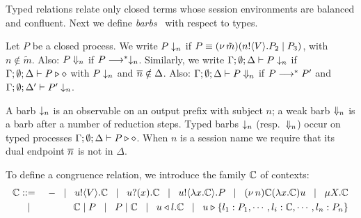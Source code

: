 \documentclass[a4paper,UKenglish]{lipics}
\theoremstyle{definition}
\begin{document}
\noi Typed relations relate only closed terms whose
session environments %
are balanced  and confluent.
Next we define  {\em barbs}~\cite{MiSa92}
with respect to types. 


\begin{definition}[Barbs]\rm
	Let $P$ be a closed process. We write
		$P \downarrow_{n}$ if $P \equiv (\nu\, \tilde{m})(n ! \langle V \rangle . P_2 \;|\; P_3)$, with $n \notin \tilde{m}$.
		Also: $P \Downarrow_{n}$ if $P \longrightarrow^* \downarrow_{n}$.
		Similarly, we write
		$\Gamma; \emptyset; \Delta \vdash P \downarrow_{n}$ if
			$\Gamma; \emptyset; \Delta \vdash P \triangleright \diamond$ with $P \downarrow_{n}$ and $\overline{n} \notin \Delta$.
			Also: $\Gamma; \emptyset; \Delta \vdash P \Downarrow_{n}$ if $P \longrightarrow^* P'$ and
			$\Gamma; \emptyset; \Delta' \vdash P' \downarrow_{n}$.			
\end{definition}

\noi A barb $\downarrow_{n}$ is an observable on an output prefix with subject $n$;
a weak barb $\Downarrow_{n}$ is a barb after a number of reduction steps.
Typed barbs $\downarrow_{n}$ (resp.\ $\Downarrow_{n}$)
occur on typed processes $\Gamma; \emptyset; \Delta \vdash P \triangleright \diamond$.
When $n$ is a session name we require that its dual endpoint $\overline{n}$ is not %
in %
$\Delta$.

To define a congruence relation, we introduce the family ${\Bbb C}$ of contexts:
\begin{eqnarray*}
	{\Bbb C} & ::= & - \;\;\;|\;\;\; u ! \langle V \rangle . {\Bbb C} \;\;\;|\;\;\; u ? (x) . {\Bbb C} \;\;\;|\;\;\; u ! \langle \lambda x.{\Bbb C} \rangle . P \;\;\;|\;\;\; (\nu\, n) {\Bbb C}
	(\lambda x.{\Bbb C})u \;\;\;|\;\;\; \mu X. {\Bbb C}\\ 
	& \;\;\;|\;\;\; & {\Bbb C} \;|\; P \;\;\;|\;\;\; P \;|\; {\Bbb C} \;\;\;|\;\;\; u \triangleleft l . {\Bbb C} \;\;\;|\;\;\; u \triangleright \{l_1:P_1,\cdots,l_i:{\Bbb C},\cdots,l_n:P_n\}
\end{eqnarray*}
\end{document}
